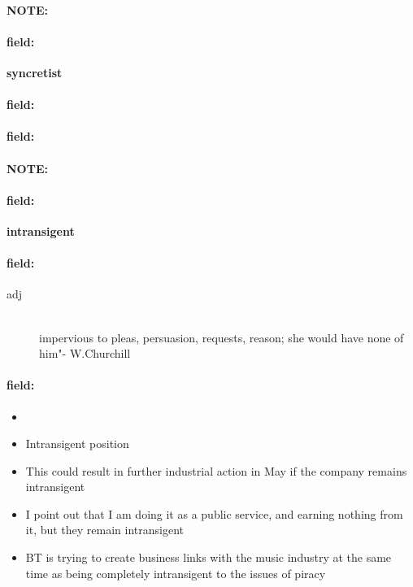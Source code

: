 \documentclass[12pt]{article}
\newenvironment{note}{\paragraph{NOTE:}}{}
\newenvironment{field}{\paragraph{field:}}{}
\begin{document}
\begin{note}
\begin{field}
\textbf{\large syncretist}
\end{field}


\begin{field}
\end{field}

\begin{field}
\end{field}
\end{note}
\begin{note}
\begin{field}
\textbf{\large intransigent}
\end{field}


\begin{field}
\begin{description}
\item[adj] \hfill \\ 
impervious to pleas, persuasion, requests, reason; she would have none of him"- W.Churchill

\end{description}
\end{field}

\begin{field}
\begin{itemize}
\item 
\item Intransigent position
\item This could result in further industrial action in May if the company remains intransigent
\item I point out that I am doing it as a public service, and earning nothing from it, but they remain intransigent
\item BT is trying to create business links with the music industry at the same time as being completely intransigent to the issues of piracy
\end{itemize}
\end{field}
\end{note}
\end{document}
